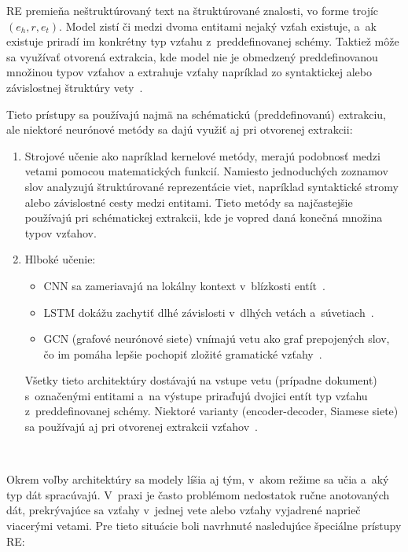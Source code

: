 RE premieňa neštruktúrovaný text na štruktúrované znalosti, vo forme trojíc $(e_h, r, e_t)$. Model zistí či medzi dvoma entitami nejaký vzťah existuje, a~ak existuje priradí im konkrétny typ vzťahu z~preddefinovanej schémy. Taktiež môže sa využívať otvorená extrakcia, kde model nie je obmedzený preddefinovanou množinou typov vzťahov a extrahuje vzťahy napríklad zo syntaktickej alebo závislostnej štruktúry vety~\cite{autKGconstruction2023,hogan2021kg}.

Tieto prístupy sa používajú najmä na schématickú (preddefinovanú) extrakciu, ale niektoré neurónové metódy sa dajú využiť aj pri otvorenej extrakcii:
\begin{enumerate}
  \item Strojové učenie ako napríklad kernelové metódy, merajú podobnosť medzi vetami pomocou matematických funkcií. Namiesto jednoduchých zoznamov slov analyzujú štruktúrované reprezentácie viet, napríklad syntaktické stromy alebo závislostné cesty medzi entitami. Tieto metódy sa najčastejšie používajú pri schématickej extrakcii, kde je vopred daná konečná množina typov vzťahov.~\cite{moncecchiRE2010,autKGconstruction2023}
  \item Hlboké učenie:
  \begin{itemize}
    \item CNN sa zameriavajú na lokálny kontext v~blízkosti entít~\cite{autKGconstruction2023}.
    \item LSTM dokážu zachytiť dlhé závislosti v~dlhých vetách a~súvetiach~\cite{autKGconstruction2023}.
    \item GCN (grafové neurónové siete) vnímajú vetu ako graf prepojených slov, čo im pomáha lepšie pochopiť zložité gramatické vzťahy~\cite{autKGconstruction2023}.
  \end{itemize}
  Všetky tieto architektúry dostávajú na vstupe vetu (prípadne dokument) s~označenými entitami a~na výstupe priraďujú dvojici entít typ vzťahu z~preddefinovanej schémy. Niektoré varianty (encoder-decoder, Siamese siete) sa používajú aj pri otvorenej extrakcii vzťahov~\cite{autKGconstruction2023}.
\end{enumerate}

\

Okrem voľby architektúry sa modely líšia aj tým, v~akom režime sa učia a~aký typ dát spracúvajú. V~praxi je často problémom nedostatok ručne anotovaných dát, prekrývajúce sa vzťahy v~jednej vete alebo vzťahy vyjadrené naprieč viacerými vetami. Pre tieto situácie boli navrhnuté nasledujúce špeciálne prístupy RE:

